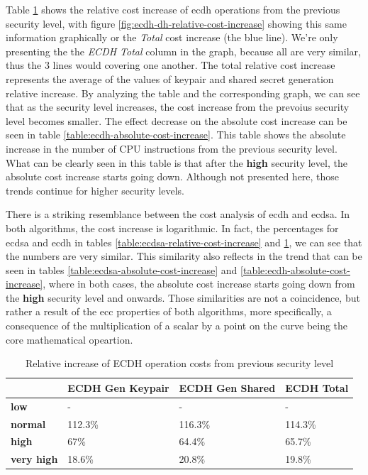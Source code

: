 \documentclass{llncs}
\begin{document}
Table \ref{table:ecdh-relative-cost-increase} shows the relative cost increase of \gls{ecdh} operations from the previous security
level, with figure \ref{fig:ecdh-dh-relative-cost-increase} showing this same information graphically or the \textit{Total} cost increase (the blue line). 
We're only presenting the the \textit{ECDH Total} column in the graph, because all are very similar, thus the $3$ lines would covering one another.
The total relative cost increase represents the average of the values of keypair and shared secret generation relative increase. 
By analyzing the table and the corresponding graph, we can see  that as the security level increases, the cost increase  from the prevoius security 
level becomes smaller. The effect decrease on the absolute cost increase can be seen in table \ref{table:ecdh-absolute-cost-increase}. 
This table shows the absolute increase in the number of CPU instructions from 
the previous security level. What can be clearly seen in this table is that after the \textbf{high} security level, the absolute cost increase starts 
going down. Although not presented here, those trends continue for higher security levels.

There is a striking resemblance between the cost analysis of \gls{ecdh} and \gls{ecdsa}. In both algorithms, the cost increase is logarithmic. 
In fact, the percentages for \gls{ecdsa} and \gls{ecdh} in tables \ref{table:ecdsa-relative-cost-increase}
and \ref{table:ecdh-relative-cost-increase}, we can see that the numbers are very similar. This similarity also reflects in the
trend that can be seen in tables \ref{table:ecdsa-absolute-cost-increase} and \ref{table:ecdh-absolute-cost-increase}, where in both cases, the
absolute cost increase starts going down from the \textbf{high} security level and onwards. Those similarities are not a coincidence, but rather
a result of the \gls{ecc} properties of both algorithms, more specifically, a consequence of the multiplication of a scalar by a point on
the curve being the core mathematical opeartion.

\begin{table}[]
  \begin{tabular}{|l|l|l|l|}
  \hline
                     & \textbf{ECDH Gen Keypair} & \textbf{ECDH Gen Shared} & \textbf{ECDH Total}  \\ \hline
  \textbf{low}       & -                         & -                        & -                    \\ \hline
  \textbf{normal}    & 112.3\%                   & 116.3\%                  & 114.3\%              \\ \hline
  \textbf{high}      & 67\%                      & 64.4\%                   & 65.7\%               \\ \hline
  \textbf{very high} & 18.6\%                    & 20.8\%                   & 19.8\%               \\ \hline
  \end{tabular}
  \caption{\label{table:ecdh-relative-cost-increase} Relative increase of ECDH operation costs from previous security level}
  \end{table}
\end{document}

